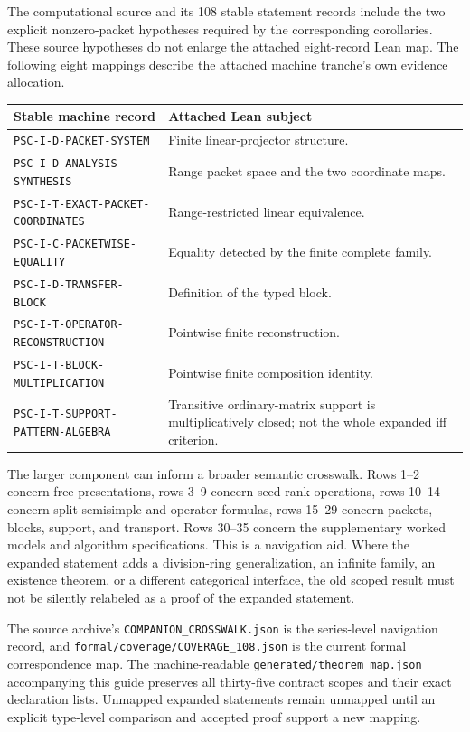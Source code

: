 \documentclass[11pt,a4paper]{article}
\newcommand{\code}[1]{\nolinkurl{#1}}
\begin{document}
The computational source and its 108 stable statement records include the two explicit nonzero-packet hypotheses required by the corresponding corollaries. These source hypotheses do not enlarge the attached eight-record Lean map. The following eight mappings describe the attached machine tranche's own evidence allocation.

\begin{longtable}{p{}p{}}
\toprule Stable machine record & Attached Lean subject \\\midrule\endhead
\code{PSC-I-D-PACKET-SYSTEM} & Finite linear-projector structure. \\
\code{PSC-I-D-ANALYSIS-SYNTHESIS} & Range packet space and the two coordinate maps. \\
\code{PSC-I-T-EXACT-PACKET-COORDINATES} & Range-restricted linear equivalence. \\
\code{PSC-I-C-PACKETWISE-EQUALITY} & Equality detected by the finite complete family. \\
\code{PSC-I-D-TRANSFER-BLOCK} & Definition of the typed block. \\
\code{PSC-I-T-OPERATOR-RECONSTRUCTION} & Pointwise finite reconstruction. \\
\code{PSC-I-T-BLOCK-MULTIPLICATION} & Pointwise finite composition identity. \\
\code{PSC-I-T-SUPPORT-PATTERN-ALGEBRA} & Transitive ordinary-matrix support is multiplicatively closed; not the whole expanded iff criterion. \\
\bottomrule
\end{longtable}

The larger component can inform a broader semantic crosswalk. Rows 1--2 concern free presentations, rows 3--9 concern seed-rank operations, rows 10--14 concern split-semisimple and operator formulas, rows 15--29 concern packets, blocks, support, and transport. Rows 30--35 concern the supplementary worked models and algorithm specifications. This is a navigation aid. Where the expanded statement adds a division-ring generalization, an infinite family, an existence theorem, or a different categorical interface, the old scoped result must not be silently relabeled as a proof of the expanded statement.

The source archive's \code{COMPANION_CROSSWALK.json} is the series-level navigation record, and \code{formal/coverage/COVERAGE_108.json} is the current formal correspondence map. The machine-readable \code{generated/theorem_map.json} accompanying this guide preserves all thirty-five contract scopes and their exact declaration lists. Unmapped expanded statements remain unmapped until an explicit type-level comparison and accepted proof support a new mapping.
\end{document}
